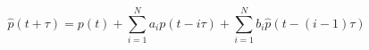 \begin{equation}
	\hat{p}(t+\tau) = p(t) + \sum_{i=1}^{N} a_i p(t-i\tau) + \sum_{i=1}^{N} b_i \hat{p}(t-(i-1)\tau)
	\label{ch2:equ:mpc-arx}
\end{equation}